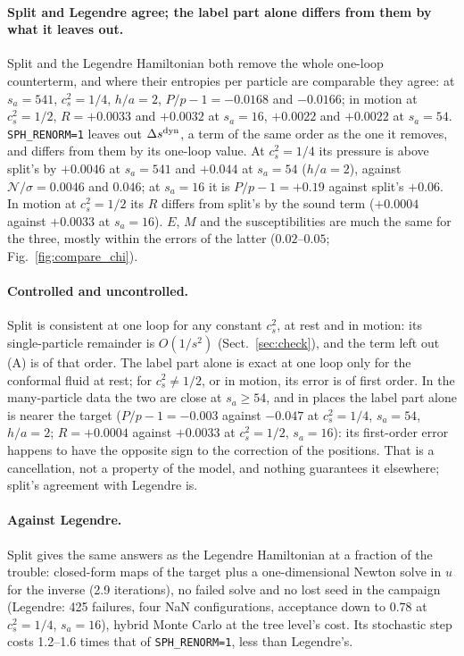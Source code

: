 \documentclass[11pt,aps,preprint,nofootinbib,superscriptaddress,tightenlines]{revtex4-2}
\def\Sect#1{Sect.~\ref{#1}}
\def\Fig#1{Fig.~\ref{#1}}
\let\oldparagraph\paragraph
\renewcommand{\paragraph}{\par\bigskip\oldparagraph}
\begin{document}
\paragraph{Split and Legendre agree; the label part alone differs from them by what it leaves out.}  Split and the Legendre Hamiltonian both remove the
whole one-loop counterterm, and where their entropies per particle are comparable they agree: at $s_a=541$, $c_s^2=1/4$, $h/a=2$, $P/p-1=-0.0168$ and
$-0.0166$; in motion at $c_s^2=1/2$, $R=+0.0033$ and $+0.0032$ at $s_a=16$, $+0.0022$ and $+0.0022$ at $s_a=54$.  \texttt{SPH\_RENORM=1} leaves out
$\Delta s^{\rm dyn}$, a term of the same order as the one it removes, and differs from them by its one-loop value.  At $c_s^2=1/4$ its pressure is above
split's by $+0.0046$ at $s_a=541$ and $+0.044$ at $s_a=54$ ($h/a=2$), against $\mathcal N/\sigma=0.0046$ and $0.046$; at $s_a=16$ it is $P/p-1=+0.19$ against
split's $+0.06$.  In motion at $c_s^2=1/2$ its $R$ differs from split's by the sound term ($+0.0004$ against $+0.0033$ at $s_a=16$).  $E$, $M$ and the
susceptibilities are much the same for the three, mostly within the errors of the latter ($0.02$--$0.05$; \Fig{fig:compare_chi}).

\paragraph{Controlled and uncontrolled.}  Split is consistent at one loop for any constant $c_s^2$, at rest and in motion: its single-particle remainder is
$O(1/s^2)$ (\Sect{sec:check}), and the term left out (A) is of that order.  The label part alone is exact at one loop only for the conformal fluid at rest; for
$c_s^2\neq1/2$, or in motion, its error is of first order.  In the many-particle data the two are close at $s_a\ge54$, and in places the label part alone is
nearer the target ($P/p-1=-0.003$ against $-0.047$ at $c_s^2=1/4$, $s_a=54$, $h/a=2$; $R=+0.0004$ against $+0.0033$ at $c_s^2=1/2$, $s_a=16$): its first-order
error happens to have the opposite sign to the correction of the positions.  That is a cancellation, not a property of the model, and nothing guarantees it
elsewhere; split's agreement with Legendre is.

\paragraph{Against Legendre.}  Split gives the same answers as the Legendre Hamiltonian at a fraction of the trouble: closed-form maps of the target plus a
one-dimensional Newton solve in $u$ for the inverse (2.9 iterations), no failed solve and no lost seed in the campaign (Legendre: 425 failures, four NaN
configurations, acceptance down to $0.78$ at $c_s^2=1/4$, $s_a=16$), hybrid Monte Carlo at the tree level's cost.  Its stochastic step costs 1.2--1.6 times that of
\texttt{SPH\_RENORM=1}, less than Legendre's.
\end{document}
